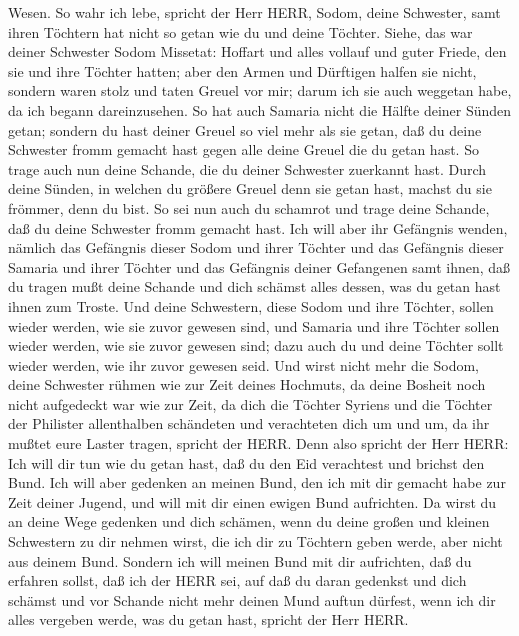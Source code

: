 Wesen.  So wahr ich lebe, spricht der Herr HERR, Sodom,
deine Schwester, samt ihren Töchtern hat nicht so getan wie du und deine
Töchter.  Siehe, das war deiner Schwester Sodom Missetat:
Hoffart und alles vollauf und guter Friede, den sie und ihre Töchter
hatten; aber den Armen und Dürftigen halfen sie nicht, 
sondern waren stolz und taten Greuel vor mir; darum ich sie auch
weggetan habe, da ich begann dareinzusehen.  So hat auch
Samaria nicht die Hälfte deiner Sünden getan; sondern du hast deiner
Greuel so viel mehr als sie getan, daß du deine Schwester fromm gemacht
hast gegen alle deine Greuel die du getan hast.  So trage
auch nun deine Schande, die du deiner Schwester zuerkannt hast. Durch
deine Sünden, in welchen du größere Greuel denn sie getan hast, machst
du sie frömmer, denn du bist. So sei nun auch du schamrot und trage
deine Schande, daß du deine Schwester fromm gemacht hast. 
Ich will aber ihr Gefängnis wenden, nämlich das Gefängnis dieser Sodom
und ihrer Töchter und das Gefängnis dieser Samaria und ihrer Töchter und
das Gefängnis deiner Gefangenen samt ihnen,  daß du tragen
mußt deine Schande und dich schämst alles dessen, was du getan hast
ihnen zum Troste.  Und deine Schwestern, diese Sodom und
ihre Töchter, sollen wieder werden, wie sie zuvor gewesen sind, und
Samaria und ihre Töchter sollen wieder werden, wie sie zuvor gewesen
sind; dazu auch du und deine Töchter sollt wieder werden, wie ihr zuvor
gewesen seid.  Und wirst nicht mehr die Sodom, deine
Schwester rühmen wie zur Zeit deines Hochmuts,  da deine
Bosheit noch nicht aufgedeckt war wie zur Zeit, da dich die Töchter
Syriens und die Töchter der Philister allenthalben schändeten und
verachteten dich um und um,  da ihr mußtet eure Laster
tragen, spricht der HERR.  Denn also spricht der Herr HERR:
Ich will dir tun wie du getan hast, daß du den Eid verachtest und
brichst den Bund.  Ich will aber gedenken an meinen Bund,
den ich mit dir gemacht habe zur Zeit deiner Jugend, und will mit dir
einen ewigen Bund aufrichten.  Da wirst du an deine Wege
gedenken und dich schämen, wenn du deine großen und kleinen Schwestern
zu dir nehmen wirst, die ich dir zu Töchtern geben werde, aber nicht aus
deinem Bund.  Sondern ich will meinen Bund mit dir
aufrichten, daß du erfahren sollst, daß ich der HERR sei, 
auf daß du daran gedenkst und dich schämst und vor Schande nicht mehr
deinen Mund auftun dürfest, wenn ich dir alles vergeben werde, was du
getan hast, spricht der Herr HERR.

